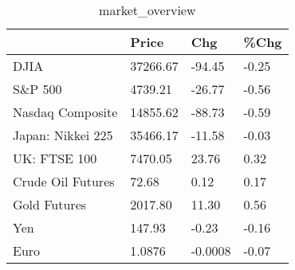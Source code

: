 \documentclass{article}%
\begin{document}
%


\begin{table}[htbp]%
\caption{market\_overview}%
\centering%
\begin{adjustbox}{width=1\textwidth}%
\begin{tabular}{llll}
\toprule
                  &    Price &     Chg &  \%Chg \\
\midrule
             DJIA & 37266.67 &  -94.45 & -0.25 \\
          S\&P 500 &  4739.21 &  -26.77 & -0.56 \\
 Nasdaq Composite & 14855.62 &  -88.73 & -0.59 \\
Japan: Nikkei 225 & 35466.17 &  -11.58 & -0.03 \\
     UK: FTSE 100 &  7470.05 &   23.76 &  0.32 \\
Crude Oil Futures &    72.68 &    0.12 &  0.17 \\
     Gold Futures &  2017.80 &   11.30 &  0.56 \\
              Yen &   147.93 &   -0.23 & -0.16 \\
             Euro &   1.0876 & -0.0008 & -0.07 \\
\bottomrule
\end{tabular}
%
\end{adjustbox}%
\end{table}

%
\end{document}
